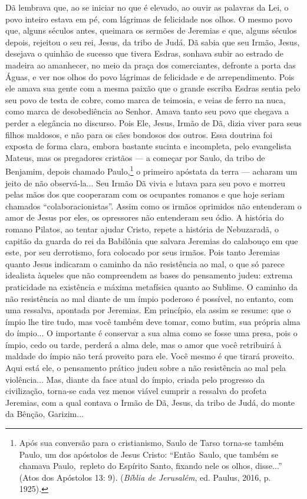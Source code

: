 Dã lembrava que, ao se iniciar no que é elevado, ao ouvir as palavras da
Lei, o povo inteiro estava em pé, com lágrimas de felicidade nos olhos.
O mesmo povo que, alguns séculos antes, queimara os sermões de Jeremias
e que, alguns séculos depois, rejeitou o seu rei, Jesus, da tribo de
Judá. Dã sabia que seu Irmão, Jesus, desejava o quinhão de sucesso que
tivera Esdras, sonhava subir ao estrado de madeira ao amanhecer, no meio
da praça dos comerciantes, defronte a porta das Águas, e ver nos olhos
do povo lágrimas de felicidade e de arrependimento. Pois ele amava sua
gente com a mesma paixão que o grande escriba Esdras sentia pelo seu
povo de testa de cobre, como marca de teimosia, e veias de ferro na
nuca, como marca de desobediência ao Senhor. Amava tanto seu povo que
chegava a perder a elegância no discurso. Pois Ele, Jesus, Irmão de Dã,
dizia viver para seus filhos maldosos, e não para os cães bondosos dos
outros. Essa doutrina foi exposta de forma clara, embora bastante
sucinta e incompleta, pelo evangelista Mateus, mas os pregadores
cristãos --- a começar por Saulo, da tribo de Benjamim, depois chamado
Paulo,\footnote{Após sua conversão para o cristianismo, Saulo de Tarso
  torna-se também Paulo, um dos apóstolos de Jesus Cristo:
  ``Então~Saulo, que também se chamava Paulo,~repleto do Espírito Santo,
  fixando nele os olhos, disse...'' (Atos dos Apóstolos 13: 9).
  (\emph{Bíblia de Jerusalém}, ed. Paulus, 2016, p. 1925).} o primeiro
apóstata da terra --- acharam um jeito de não observá-la... Seu Irmão Dã
vivia e lutava para seu povo e morreu pelas mãos dos que cooperaram com
os ocupantes romanos e que hoje seriam chamados ``colaboracionistas''.
Assim como os irmãos oprimidos não entenderam o amor de Jesus por eles,
os opressores não entenderam seu ódio. A história do romano Pilatos, ao
tentar ajudar Cristo, repete a história de Nebuzaradã, o capitão da
guarda do rei da Babilônia que salvara Jeremias do calabouço em que
este, por seu derrotismo, fora colocado por seus irmãos. Pois tanto
Jeremias quanto Jesus indicaram o caminho da não resistência ao mal, o
que só parece idealista àqueles que não compreendem as bases do
pensamento judeu: extrema praticidade na existência e máxima metafísica
quanto ao Sublime. O caminho da não resistência ao mal diante de um
ímpio poderoso é possível, no entanto, com uma ressalva, apontada por
Jeremias. Em princípio, ela assim se resume: que o ímpio lhe tire tudo,
mas você também deve tomar, como butim, sua própria alma do ímpio... O
importante é conservar a sua alma como se fosse uma presa, pois o ímpio,
cedo ou tarde, perderá a alma dele, mas o amor que você retribuirá à
maldade do ímpio não terá proveito para ele. Você mesmo é que tirará
proveito. Aqui está ele, o pensamento prático judeu sobre a não
resistência ao mal pela violência... Mas, diante da face atual do ímpio,
criada pelo progresso da civilização, torna-se cada vez menos viável
cumprir a ressalva do profeta Jeremias, com a qual contava o Irmão de
Dã, Jesus, da tribo de Judá, do monte da Bênção, Garizim...

